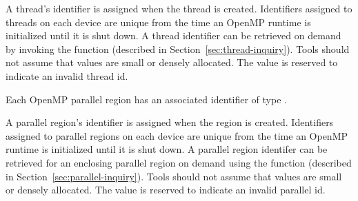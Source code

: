 \begin{comment}
ompt\_event\_sync\_region           & * & * & * & * & * \\
ompt\_event\_init\_lock             & * & * & * & * & * \\
ompt\_event\_destroy\_lock          & * & * & * & * & * \\
ompt\_event\_mutex\_acquire         & * & * & * & * & * \\
ompt\_event\_mutex\_acquired        & * & * & * & * & * \\
ompt\_event\_nested\_lock           & * & * & * & * & * \\
ompt\_event\_flush                  & * & * & * & * & * \\
\bottomrule
\end{tabular}
\caption{Valid return codes of \code{ompt\_set\_callback} for each input event argument.}
\label{table:valid_rc}
\end{table}

\section{OMPT Data Types}
\label{sec:data}

\littleheader{Thread Identifier}
\index{Thread Identifier}

Each OpenMP thread  has an associated identifier of type \code{ompt\_thread\_id\_t}. 
\begin{comment}
\begin{boxedcode}
typedef uint64\_t ompt\_thread\_id\_t;
\end{boxedcode}
\end{comment}
  A thread's identifier is assigned when the thread is created. 
  Identifiers assigned to threads on each device are unique from the time an OpenMP runtime is initialized until it is shut down.
  A thread identifier can be retrieved
  on demand by invoking the     
  function (described in Section~\ref{sec:thread-inquiry}).
  Tools should not assume that  values are small or densely allocated. 
  The value  is reserved to indicate an invalid thread id.

Each OpenMP parallel region has an associated identifier of type
. 
\begin{comment}
\begin{boxedcode}
typedef uint64\_t ompt\_parallel\_id\_t;
\end{boxedcode}
\end{comment}
\noindent
  A parallel region's identifier is assigned
  when the region is created.  Identifiers assigned to parallel regions on each device are unique from the time an 
  OpenMP runtime is initialized until it is shut down. 
  A parallel region identifer can be retrieved for an enclosing parallel region
  on demand using the function   (described in Section~\ref{sec:parallel-inquiry}).
  Tools should not assume that  values are small or densely allocated.
  The value  is reserved to indicate an invalid parallel id.
 
